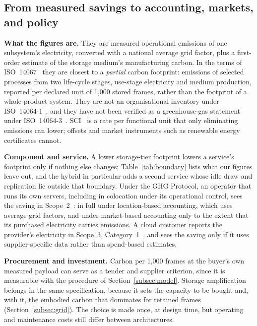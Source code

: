 \documentclass[pdflatex,sn-basic]{sn-jnl}%
\begin{document}
\subsection{From measured savings to accounting, markets, and policy}\label{subsec:accounting}
\textbf{What the figures are.} They are measured operational emissions of one subsystem's electricity, converted with a national average grid factor, plus a first-order estimate of the storage medium's manufacturing carbon. In the terms of ISO~14067~\citep{iso_14067_cfp} they are closest to a \emph{partial} carbon footprint: emissions of selected processes from two life-cycle stages, use-stage electricity and medium production, reported per declared unit of 1{,}000 stored frames, rather than the footprint of a whole product system. They are not an organisational inventory under ISO~14064-1~\citep{iso_14064_1_inventory}, and they have not been verified as a greenhouse-gas statement under ISO~14064-3~\citep{iso_14064_3_verification}. SCI~\citep{gsf_sci,iso_iec_21031_sci} is a rate per functional unit that only eliminating emissions can lower; offsets and market instruments such as renewable energy certificates cannot.

\textbf{Component and service.} A lower storage-tier footprint lowers a service's footprint only if nothing else changes; Table~\ref{tab:boundary} lists what our figures leave out, and the hybrid in particular adds a second service whose idle draw and replication lie outside that boundary. Under the GHG Protocol, an operator that runs its own servers, including in colocation under its operational control, sees the saving in Scope~2~\citep{ghgp_scope2_guidance}: in full under location-based accounting, which uses average grid factors, and under market-based accounting only to the extent that its purchased electricity carries emissions. A cloud customer reports the provider's electricity in Scope~3, Category~1~\citep{ghgp_scope3_standard}, and sees the saving only if it uses supplier-specific data rather than spend-based estimates.

\textbf{Procurement and investment.} Carbon per 1{,}000 frames at the buyer's own measured payload can serve as a tender and supplier criterion, since it is measurable with the procedure of Section~\ref{subsec:model}. Storage amplification belongs in the same specification, because it sets the capacity to be bought and, with it, the embodied carbon that dominates for retained frames (Section~\ref{subsec:grid}). The choice is made once, at design time, but operating and maintenance costs still differ between architectures.
\end{document}
